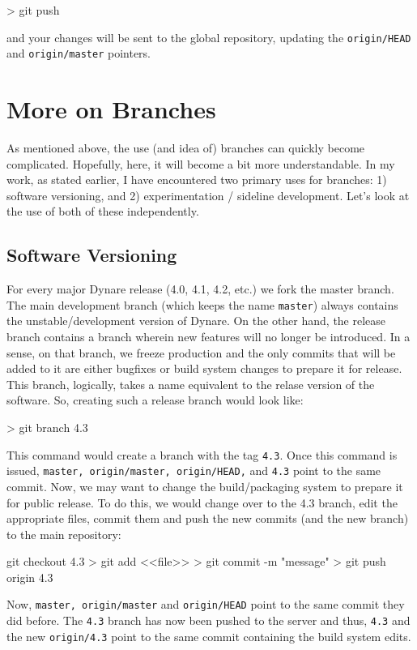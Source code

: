 \documentclass[10pt,letterpaper]{article}
\begin{document}
\begin{code}
> git push
\end{code}
\noindent and your changes will be sent to the global repository, updating the \texttt{origin/HEAD} and \texttt{origin/master} pointers.\smiley

\section{More on Branches}

As mentioned above, the use (and idea of) branches can quickly become complicated. Hopefully, here, it will become a bit more understandable. In my work, as stated earlier, I have encountered two primary uses for branches: 1) software versioning, and 2) experimentation / sideline development. Let's look at the use of both of these independently.

\subsection{Software Versioning}

For every major Dynare release (4.0, 4.1, 4.2, etc.) we fork the master branch. The main development branch (which keeps the name \texttt{master}) always contains the unstable/development version of Dynare. On the other hand, the release branch contains a branch wherein new features will no longer be introduced. In a sense, on that branch, we freeze production and the only commits that will be added to it are either bugfixes or build system changes to prepare it for release. This branch, logically, takes a name equivalent to the relase version of the software. So, creating such a release branch would look like:

\begin{code}
> git branch 4.3
\end{code}
\noindent This command would create a branch with the tag \texttt{4.3}. Once this command is issued, \texttt{master, origin/master, origin/HEAD,} and \texttt{4.3} point to the same commit. Now, we may want to change the build/packaging system to prepare it for public release. To do this, we would change over to the 4.3 branch, edit the appropriate files, commit them and push the new commits (and the new branch) to the main repository:

\begin{code}
git checkout 4.3
> git add <<file>>
> git commit -m "message"
> git push origin 4.3
\end{code}
\noindent Now, \texttt{master, origin/master} and \texttt{origin/HEAD} point to the same commit they did before. The \texttt{4.3} branch has now been pushed to the server and thus, \texttt{4.3} and the new \texttt{origin/4.3} point to the same commit containing the build system edits.
\end{document}
